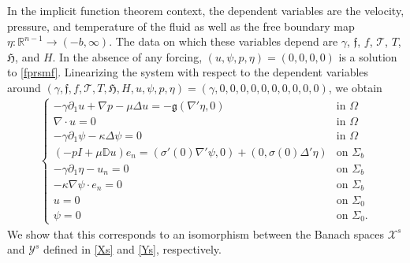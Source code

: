 \documentclass[11pt,letterpaper,reqno]{amsart}
\numberwithin{equation}{section}
\begin{document}
In the implicit function theorem context, the dependent variables are the velocity, pressure, and temperature of the fluid as well as the free boundary map \(\eta: \mathbb{R}^{n-1} \to (-b, \infty)\). The data on which these variables depend are \(\gamma\), \(\mathfrak{f}\), \(f\), \(\mathcal{T}\), \(T\), \(\mathfrak{H}\), and \(H\). In the absence of any forcing, \((u, \psi, p, \eta)=(0,0,0,0)\) is a solution to \eqref{fprsmf}. Linearizing the system with respect to the dependent variables around \((\gamma,\mathfrak{f},f, \mathcal{T},T,\mathfrak{H},H, u, \psi,p,\eta)=(\gamma,0,0,0,0,0,0,0,0,0,0)\), we obtain
\begin{align} \label{ls}
    \begin{cases}
    -\gamma \partial_{1}u + \nabla p - \mu \Delta u = -\mathfrak{g}(\nabla'\eta,0) &\mbox{in \(\Omega\)} \\
    \nabla \cdot u = 0 &\mbox{in \(\Omega\)} \\
    -\gamma \partial_{1}\psi - \kappa \Delta \psi = 0 &\mbox{in \(\Omega\)} \\
    (-pI+\mu\mathbb{D}u)e_{n} = (\sigma'(0)\nabla'\psi,0)+(0,\sigma(0)\Delta'\eta) &\mbox{on \(\Sigma_{b}\)} \\
    -\gamma\partial_{1}\eta-u_{n}=0 &\mbox{on \(\Sigma_{b}\)} \\
    -\kappa\nabla\psi \cdot e_{n} = 0 &\mbox{on \(\Sigma_{b}\)} \\
    u = 0 &\mbox{on \(\Sigma_{0}\)} \\
    \psi = 0 &\mbox{on \(\Sigma_{0}\)}.
    \end{cases}
\end{align}
We show that this corresponds to an isomorphism between the Banach spaces  \(\mathcal{X}^{s}\) and \(\mathcal{Y}^{s}\) defined in \eqref{Xs} and \eqref{Ys}, respectively.
\end{document}
